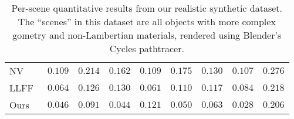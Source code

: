 \documentclass[runningheads]{llncs}
\begin{document}
\begin{table}[t]
{\begin{tabular}{l|cccccccc}
NV~\cite{neuralvolumes}   & $0.109$ & $0.214$ & $0.162$ & $0.109$ & $0.175$ & $0.130$ & $0.107$ & $0.276$ \\
LLFF~\cite{mildenhall19}  & $0.064$ & $0.126$ & $0.130$ & $\mathbf{0.061}$ & $0.110$ & $0.117$ & $0.084$ & $0.218$ \\
Ours                      & $\mathbf{0.046}$ & $\mathbf{0.091}$ & $\mathbf{0.044}$ & ${0.121}$ & $\mathbf{0.050}$ & $\mathbf{0.063}$ & $\mathbf{0.028}$ & $\mathbf{0.206}$ \\
\hline
\end{tabular}
} \vspace{2mm}
\caption{Per-scene quantitative results from our realistic synthetic dataset. The ``scenes'' in this dataset are all objects with more complex gometry and non-Lambertian materials, rendered using Blender's Cycles pathtracer.
}
\label{table:suppresults2} 
\end{table}
\setlength{\tabcolsep}{1.4pt}
\end{document}
